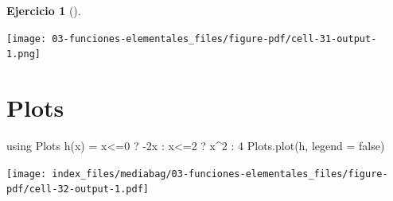 \documentclass[
  a4paper,
]{scrreport}
\newenvironment{Shaded}{\begin{snugshade}}{\end{snugshade}}
\newcommand{\BuiltInTok}[1]{\textcolor[rgb]{0.00,0.23,0.31}{#1}}
\newcommand{\ConstantTok}[1]{\textcolor[rgb]{0.56,0.35,0.01}{#1}}
\newcommand{\FloatTok}[1]{\textcolor[rgb]{0.68,0.00,0.00}{#1}}
\newcommand{\FunctionTok}[1]{\textcolor[rgb]{0.28,0.35,0.67}{#1}}
\newcommand{\ImportTok}[1]{\textcolor[rgb]{0.00,0.46,0.62}{#1}}
\newcommand{\NormalTok}[1]{\textcolor[rgb]{0.00,0.23,0.31}{#1}}
\newcommand{\OperatorTok}[1]{\textcolor[rgb]{0.37,0.37,0.37}{#1}}
\theoremstyle{definition}
\newtheorem{exercise}{Ejercicio}[chapter]
\theoremstyle{remark}
\begin{document}
\begin{exercise}[]
\begin{tcolorbox}
\texttt{[image: 03-funciones-elementales\_files/figure-pdf/cell-31-output-1.png]}

\section{Plots}

\begin{Shaded}
\begin{Highlighting}[]
\ImportTok{using} \BuiltInTok{Plots}
\FunctionTok{h}\NormalTok{(x) }\OperatorTok{=}\NormalTok{ x}\OperatorTok{\textless{}=}\FloatTok{0}\NormalTok{ ? }\OperatorTok{{-}}\FloatTok{2}\NormalTok{x }\OperatorTok{:}\NormalTok{ x}\OperatorTok{\textless{}=}\FloatTok{2}\NormalTok{ ? x}\OperatorTok{\^{}}\FloatTok{2} \OperatorTok{:} \FloatTok{4}
\NormalTok{Plots.}\FunctionTok{plot}\NormalTok{(h, legend }\OperatorTok{=} \ConstantTok{false}\NormalTok{)}
\end{Highlighting}
\end{Shaded}

\texttt{[image: index\_files/mediabag/03-funciones-elementales\_files/figure-pdf/cell-32-output-1.pdf]}

\end{tcolorbox}

\end{exercise}
\end{document}
